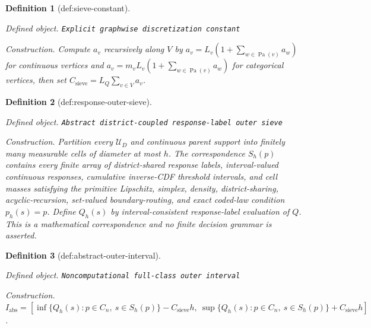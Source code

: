 \documentclass{article}
\newtheorem{definition}{Definition}
\begin{document}
\begin{definition}[def:sieve-constant]\label{def:sieve-constant}
\par\smallskip\noindent\emph{Defined object.} \texttt{Explicit graphwise discretization constant}
\par\smallskip\noindent\emph{Construction.} Compute \(a_v\) recursively along \(V\) by \(a_v=L_v(1+\sum_{w\in\operatorname{Pa}(v)}a_w)\) for continuous vertices and \(a_v=m_vL_v(1+\sum_{w\in\operatorname{Pa}(v)}a_w)\) for categorical vertices, then set \(C_{\mathrm{sieve}}=L_Q\sum_{v\in V}a_v\).
\end{definition}

\begin{definition}[def:response-outer-sieve]\label{def:response-outer-sieve}
\par\smallskip\noindent\emph{Defined object.} \texttt{Abstract district-\allowbreak{}coupled response-\allowbreak{}label outer sieve}
\par\smallskip\noindent\emph{Construction.} Partition every \(\mathcal U_D\) and continuous parent support into finitely many measurable cells of diameter at most \(h\). The correspondence \(S_h(p)\) contains every finite array of district-shared response labels, interval-valued continuous responses, cumulative inverse-CDF threshold intervals, and cell masses satisfying the primitive Lipschitz, simplex, density, district-sharing, acyclic-recursion, set-valued boundary-routing, and exact coded-law condition \(p_h(s)=p\). Define \(Q_h(s)\) by interval-consistent response-label evaluation of \(Q\). This is a mathematical correspondence and no finite decision grammar is asserted.
\end{definition}

\begin{definition}[def:abstract-outer-interval]\label{def:abstract-outer-interval}
\par\smallskip\noindent\emph{Defined object.} \texttt{Noncomputational full-\allowbreak{}class outer interval}
\par\smallskip\noindent\emph{Construction.} \(I_{\mathrm{abs}}=[\inf\{Q_h(s):p\in C_n,\ s\in S_h(p)\}-C_{\mathrm{sieve}}h,\ \sup\{Q_h(s):p\in C_n,\ s\in S_h(p)\}+C_{\mathrm{sieve}}h]\).
\end{definition}
\end{document}
